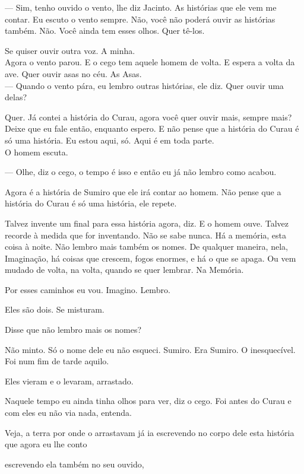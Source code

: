 --- Sim, tenho ouvido o vento, lhe diz Jacinto. As histórias que ele vem
me contar. Eu escuto o vento sempre. Não, você não poderá ouvir as
histórias também. Não. Você ainda tem esses olhos. Quer tê-los.

Se quiser ouvir outra voz. A minha.\\

Agora o vento parou. E o cego tem aquele homem de volta. E espera a
volta da ave. Quer ouvir asas no céu. As Asas.\\

--- Quando o vento pára, eu lembro outras histórias, ele diz. Quer ouvir
uma delas?

Quer. Já contei a história do Curau, agora você quer ouvir mais, sempre
mais? Deixe que eu fale então, enquanto espero. E não pense que a
história do Curau é só uma história. Eu estou aqui, só. Aqui é em toda
parte.\\

O homem escuta.

--- Olhe, diz o cego, o tempo é isso e então eu já não lembro como acabou.

Agora é a história de Sumiro que ele irá contar ao homem. Não pense que
a história do Curau é só uma história, ele repete.

Talvez invente um final para essa história agora, diz. E o homem ouve.
Talvez recorde à medida que for inventando. Não se sabe nunca. Há a
memória, esta coisa à noite. Não lembro mais também os nomes. De
qualquer maneira, nela, Imaginação, há coisas que crescem, fogos
enormes, e há o que se apaga. Ou vem mudado de volta, na volta, quando
se quer lembrar. Na Memória.

Por esses caminhos eu vou. Imagino. Lembro.

Eles são dois. Se misturam.

Disse que não lembro mais os nomes?

Não minto. Só o nome dele eu não esqueci. Sumiro. Era Sumiro. O
inesquecível.\\

Foi num fim de tarde aquilo.

Eles vieram e o levaram, arrastado.

Naquele tempo eu ainda tinha olhos para ver, diz o cego. Foi antes do
Curau e com eles eu não via nada, entenda.

Veja, a terra por onde o arrastavam já ia escrevendo no corpo dele esta
história que agora eu lhe conto

escrevendo ela também no seu ouvido,

